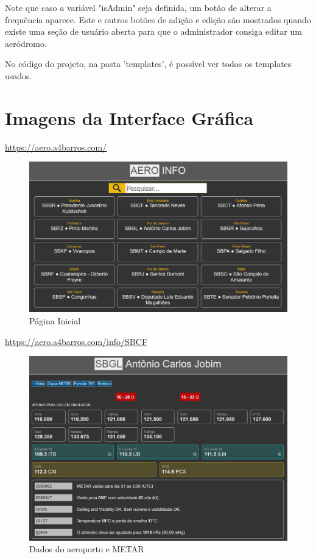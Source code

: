 Note que caso a variável "isAdmin" seja definida, um botão de alterar a frequência aparece. Este
e outros botões de adição e edição são mostrados quando existe uma seção de usuário aberta para que o administrador
consiga editar um aeródromo.

No código do projeto, na pasta 'templates', é possível ver todos os templates usados.

\section{Imagens da Interface Gráfica}

\url{https://aero.a4barros.com/}

\begin{figure}[H]
    \begin{center}
    \includegraphics[width=\linewidth]{img/sel-aeroporto.png}
    \caption{Página Inicial}
    \label{fig:sel-aeroporto}
    \end{center}
\end{figure}

\url{https://aero.a4barros.com/info/SBCF}

\begin{figure}[H]
    \begin{center}
    \includegraphics[width=\linewidth]{img/img-metar.png}
    \caption{Dados do aeroporto e METAR}
    \label{fig:img-metar.png}
    \end{center}
\end{figure}

